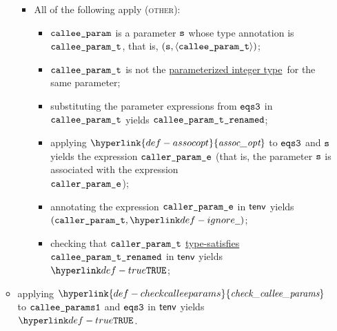 \documentclass{book}
\newcommand\ProseOrTypeError[0]{\ProseTerminateAs{\TypeErrorConfig}}
\newcommand\assocopt[0]{\hyperlink{def-assocopt}{\textfunc{assoc\_opt}}}
\newcommand\checkcalleeparams[0]{\hyperlink{def-checkcalleeparams}{\textfunc{check\_callee\_params}}}
\newcommand\parameterizedintegertype[0]{\hyperlink{def-parameterizedintegertype}{parameterized integer type}}
\newcommand\typesatisfies[0]{\hyperlink{def-typesatisfies}{type-satisfies}}
\begin{document}
\begin{itemize}
\begin{itemize}
\begin{itemize}
      \item All of the following apply (\textsc{other}):
      \begin{itemize}
        \item $\texttt{callee\_param}$ is a parameter $\texttt{s}$ whose type annotation is \\
              $\texttt{callee\_param\_t}$, that is, $(\texttt{s}, \langle\texttt{callee\_param\_t}\rangle)$;
        \item $\texttt{callee\_param\_t}$ is not the \parameterizedintegertype\ for the same parameter;
        \item substituting the parameter expressions from $\texttt{eqs3}$ in $\texttt{callee\_param\_t}$
              yields $\texttt{callee\_param\_t\_renamed}$\ProseOrTypeError;
        \item applying $\assocopt$ to $\texttt{eqs3}$ and $\texttt{s}$ yields the expression $\texttt{caller\_param\_e}$
              (that is, the parameter $\texttt{s}$ is associated with the expression \\
              $\texttt{caller\_param\_e}$);
        \item annotating the expression $\texttt{caller\_param\_e}$ in $\textsf{tenv}$ yields \\
              $(\callerparamt, \Ignore)$\ProseOrTypeError;
        \item checking that $\texttt{caller\_param\_t}$ \typesatisfies\ $\texttt{callee\_param\_t\_renamed}$ in $\textsf{tenv}$ yields
              $\True$\ProseOrTypeError;
      \end{itemize}
    \end{itemize}
    \item applying $\checkcalleeparams$ to $\texttt{callee\_params1}$ and $\texttt{eqs3}$ in $\textsf{tenv}$
          yields \\ $\True$\ProseOrTypeError.
  \end{itemize}
\end{itemize}
\end{document}
